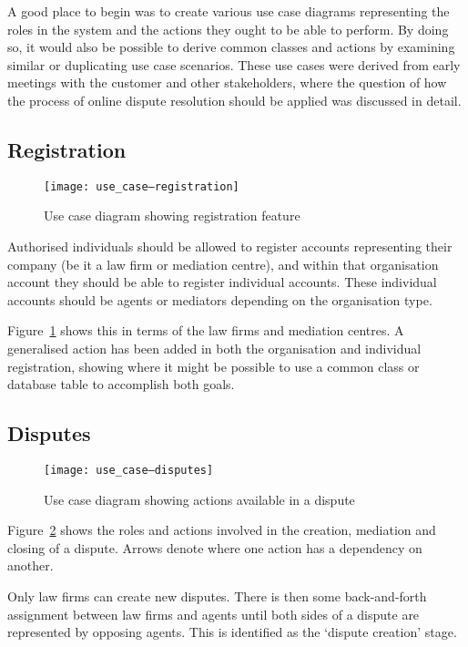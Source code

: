 A good place to begin was to create various use case diagrams representing the roles in the system and the actions they ought to be able to perform. By doing so, it would also be possible to derive common classes and actions by examining similar or duplicating use case scenarios. These use cases were derived from early meetings with the customer and other stakeholders, where the question of how the process of online dispute resolution should be applied was discussed in detail.

\subsection{Registration}

\begin{figure}[h!]
  \centering
    \ifimages
    \texttt{[image: use\_case--registration]}
    \fi
  \caption{Use case diagram showing registration feature}
  \label{uml:useCase:registration}
\end{figure}

Authorised individuals should be allowed to register accounts representing their company (be it a law firm or mediation centre), and within that organisation account they should be able to register individual accounts. These individual accounts should be agents or mediators depending on the organisation type.

Figure~\ref{uml:useCase:registration} shows this in terms of the law firms and mediation centres. A generalised action has been added in both the organisation and individual registration, showing where it might be possible to use a common class or database table to accomplish both goals.

\subsection{Disputes}

\begin{figure}[h!]
  \centering
    \ifimages
    \texttt{[image: use\_case--disputes]}
    \fi
  \caption{Use case diagram showing actions available in a dispute}
  \label{uml:useCase:disputes}
\end{figure}

Figure~\ref{uml:useCase:disputes} shows the roles and actions involved in the creation, mediation and closing of a dispute. Arrows denote where one action has a dependency on another.

Only law firms can create new disputes. There is then some back-and-forth assignment between law firms and agents until both sides of a dispute are represented by opposing agents. This is identified as the `dispute creation' stage.

